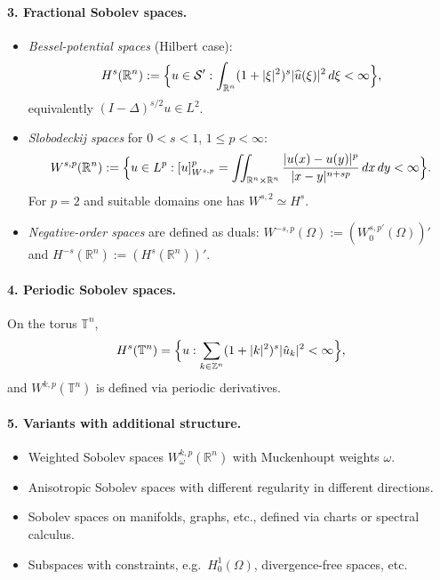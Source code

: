 \documentclass[12pt,a4paper]{article}
\theoremstyle{plain}
\theoremstyle{definition}
\theoremstyle{remark}
\theoremstyle{remark}
\begin{document}
\medskip

\paragraph{3. Fractional Sobolev spaces.}
\begin{itemize}
	\item[(a)] \emph{Bessel-potential spaces} (Hilbert case):
	\[
	H^s(\mathbb R^n)
	:= \Bigl\{u\in\mathcal S' : \int_{\mathbb R^n}(1+|\xi|^2)^s|\widehat u(\xi)|^2\,d\xi<\infty\Bigr\},
	\]
	equivalently $(I-\Delta)^{s/2}u\in L^2$.
	\item[(b)] \emph{Slobodeckij spaces} for $0<s<1$, $1\le p<\infty$:
	\[
	W^{s,p}(\mathbb R^n)
	:= \Bigl\{u\in L^p : [u]_{W^{s,p}}^p
	= \iint_{\mathbb R^n\times\mathbb R^n}\frac{|u(x)-u(y)|^p}{|x-y|^{n+sp}}\,dx\,dy <\infty\Bigr\}.
	\]
	For $p=2$ and suitable domains one has $W^{s,2}\simeq H^s$.
	\item[(c)] \emph{Negative-order spaces} are defined as duals:
	$W^{-s,p}(\Omega) := (W^{s,p'}_0(\Omega))'$ and $H^{-s}(\mathbb R^n):=(H^s(\mathbb R^n))'$.
\end{itemize}

\medskip

\paragraph{4. Periodic Sobolev spaces.}
On the torus $\mathbb T^n$,
\[
H^s(\mathbb T^n) = \Bigl\{u:\sum_{k\in\mathbb Z^n}(1+|k|^2)^s|\hat u_k|^2<\infty\Bigr\},
\]
and $W^{k,p}(\mathbb T^n)$ is defined via periodic derivatives.

\medskip

\paragraph{5. Variants with additional structure.}
\begin{itemize}
	\item Weighted Sobolev spaces $W^{k,p}_\omega(\mathbb R^n)$ with Muckenhoupt weights $\omega$.
	\item Anisotropic Sobolev spaces with different regularity in different directions.
	\item Sobolev spaces on manifolds, graphs, etc., defined via charts or spectral calculus.
	\item Subspaces with constraints, e.g.\ $H^1_0(\Omega)$, divergence-free spaces, etc.
\end{itemize}
\end{document}
